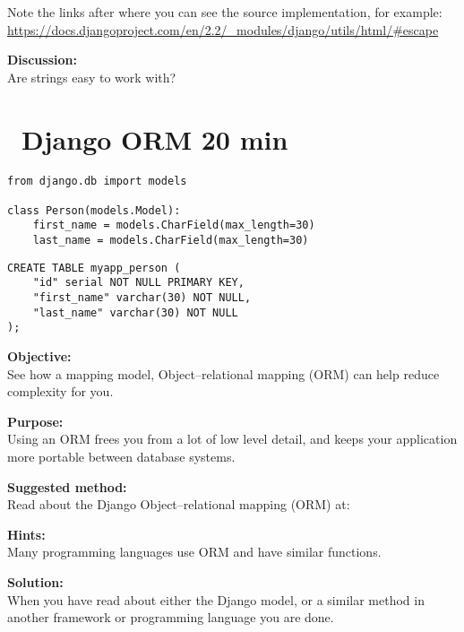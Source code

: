 \documentclass[a4paper,11pt,notitlepage]{report}
\begin{document}
Note the links after where you can see the source implementation, for example:\\
\url{https://docs.djangoproject.com/en/2.2/_modules/django/utils/html/#escape}


{\bf Discussion:}\\
Are strings easy to work with?


\chapter{\faExclamationTriangle\ Django ORM 20 min}
\label{ex:django-orm}

\begin{verbatim}
from django.db import models

class Person(models.Model):
    first_name = models.CharField(max_length=30)
    last_name = models.CharField(max_length=30)
\end{verbatim}

\begin{verbatim}
CREATE TABLE myapp_person (
    "id" serial NOT NULL PRIMARY KEY,
    "first_name" varchar(30) NOT NULL,
    "last_name" varchar(30) NOT NULL
);
\end{verbatim}

{\bf Objective:}\\
See how a mapping model, Object–relational mapping (ORM) can help reduce complexity for you.


{\bf Purpose:}\\
Using an ORM frees you from a lot of low level detail, and keeps your application more portable between database systems.


{\bf Suggested method:}\\
Read about the Django  Object–relational mapping (ORM) at:

\begin{list2}
\item {}
\item {}
\end{list2}

{\bf Hints:}\\
Many programming languages use ORM and have similar functions.

{\bf Solution:}\\
When you have read about either the Django model, or a similar method in another framework or programming language you are done.
\end{document}

